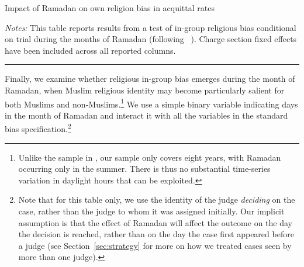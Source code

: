 \documentclass[12pt,english]{article}
\begin{document}

    \begin{table}%
      \begin{center}
        \caption{Impact of Ramadan on own religion bias in acquittal rates}
        \label{tab:ramadan_acq}
        
      \begin{minipage}{1\textwidth}
   \footnotesize \emph{Notes:} This table reports results from a test of in-group religious bias conditional on trial during the months of Ramadan (following ~\cite{Mehmood2020}). Charge section fixed effects have been included across all reported columns. \\ \hrule
   \end{minipage}
    \end{center}
    \end{table}

Finally, we examine whether religious in-group bias emerges during the month of Ramadan, when Muslim religious identity may become particularly salient for both Muslims and non-Muslims.\footnote{Unlike the sample in \citet{Mehmood2020}, our sample only covers eight years, with Ramadan occurring only in the summer. There is thus no substantial time-series variation in daylight hours that can be exploited.} We use a simple binary variable indicating days in the month of Ramadan and interact it with all the variables in the standard bias specification.\footnote{Note that for this table only, we use the identity of the judge \textit{deciding} on the case, rather than the judge to whom it was assigned initially. Our implicit assumption is that the effect of Ramadan will affect the outcome on the day the decision is reached, rather than on the day the case first appeared before a judge (see Section~\ref{sec:strategy} for more on how we treated cases seen by more than one judge).}
\end{document}
